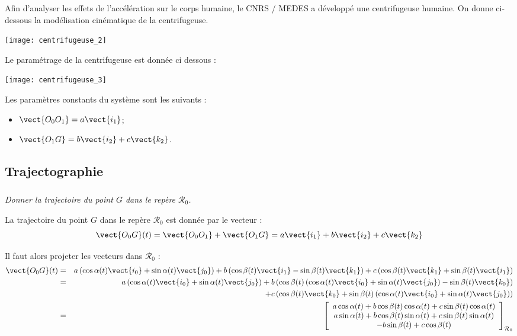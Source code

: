\ifprof
\else
\begin{multicols}{2}
\fi


Afin d'analyser les effets de l'accélération sur le corps humaine, le CNRS / MEDES a développé une centrifugeuse humaine. On donne ci-dessous la modélisation cinématique de la centrifugeuse.

\begin{center}
\texttt{[image: centrifugeuse\_2]}

\end{center}


Le paramétrage de la centrifugeuse est donnée ci dessous : 



\begin{center}
\texttt{[image: centrifugeuse\_3]}
\end{center}

Les paramètres constants du système sont les suivants : 
\begin{itemize}%
\item $\vect{O_0O_1} = a \vect{i_1}$;
\item $\vect{O_1G} = b \vect{i_2} + c \vect{k_2}$.
\end{itemize}


\subsection*{Trajectographie}

\subparagraph{}
\textit{Donner la trajectoire du point $G$ dans le repère $\mathcal{R}_0$.}
\ifprof
\begin{corrige}
La trajectoire du point $G$ dans le repère $\mathcal{R}_0$  est donnée par le vecteur :
$$
\vect{O_0 G}(t)  = \vect{O_0O_1} + \vect{O_1G}
= a \vect{i_1} +  b \vect{i_2} + c \vect{k_2}
$$

Il faut alors projeter les vecteurs dans $\mathcal{R}_0$ : 
\begin{eqnarray*}
\vect{O_0 G}(t) &=& a \left(\cos\alpha(t) \vect{i_0} + \sin\alpha(t) \vect{j_0} \right) 
+ b \left(\cos\beta(t) \vect{i_1} - \sin\beta(t) \vect{k_1} \right) 
+ c\left(\cos\beta(t) \vect{k_1} + \sin\beta(t)\vect{i_1}\right)\\
&=& a \left(\cos\alpha(t) \vect{i_0} + \sin\alpha(t) \vect{j_0} \right) 
+ b \left(\cos\beta(t) \left(\cos\alpha(t) \vect{i_0} + \sin\alpha(t) \vect{j_0} \right) - \sin\beta(t) \vect{k_0} \right) \\
&& + c\left(\cos\beta(t) \vect{k_0} + \sin\beta(t)  \left(\cos\alpha(t) \vect{i_0} + \sin\alpha(t) \vect{j_0} \right) \right)\\
&=& \left[ \begin{array}{c} 
a \cos\alpha(t) + b \cos\beta(t) \cos\alpha(t) +c \sin\beta(t)\cos\alpha(t)\\
a \sin\alpha(t) + b \cos\beta(t) \sin\alpha(t) +c \sin\beta(t)\sin\alpha(t) \\
- b\sin\beta(t) + c\cos\beta(t)
\end{array}\right]_{\mathcal{R}_0}
\end{eqnarray*}


\end{corrige}
\end{multicols}
